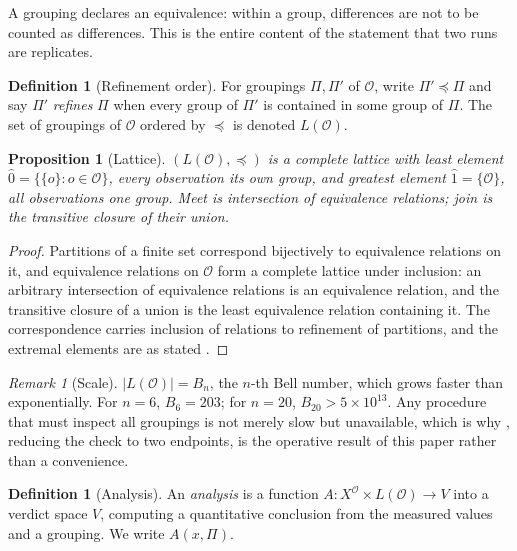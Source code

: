 \documentclass[11pt,a4paper]{article}
\newtheorem{proposition}[theorem]{Proposition}
\theoremstyle{definition}
\newtheorem{definition}[theorem]{Definition}
\theoremstyle{remark}
\newtheorem{remark}[theorem]{Remark}
\newcommand{\Obs}{\mathcal{O}}               %
\newcommand{\Part}{\Pi}                      %
\begin{document}
A grouping declares an equivalence: within a group, differences are not
to be counted as differences. This is the entire content of the statement
that two runs are replicates.

\begin{definition}[Refinement order]\label{def:refine}
For groupings $\Part,\Part'$ of $\Obs$, write $\Part' \preceq \Part$ and
say $\Part'$ \emph{refines} $\Part$ when every group of $\Part'$ is
contained in some group of $\Part$. The set of groupings of $\Obs$
ordered by $\preceq$ is denoted $L(\Obs)$.
\end{definition}

\begin{proposition}[Lattice]\label{prop:lattice}
$(L(\Obs),\preceq)$ is a complete lattice with least element
$\hat{0} = \{\{o\} : o \in \Obs\}$, every observation its own group, and
greatest element $\hat{1} = \{\Obs\}$, all observations one group. Meet
is intersection of equivalence relations; join is the transitive closure
of their union.
\end{proposition}

\begin{proof}
Partitions of a finite set correspond bijectively to equivalence
relations on it, and equivalence relations on $\Obs$ form a complete
lattice under inclusion: an arbitrary intersection of equivalence
relations is an equivalence relation, and the transitive closure of a
union is the least equivalence relation containing it. The correspondence
carries inclusion of relations to refinement of partitions, and the
extremal elements are as stated \citep{birkhoff1967lattice}.
\end{proof}

\begin{remark}[Scale]\label{rem:bell}
$|L(\Obs)| = B_n$, the $n$-th Bell number, which grows faster than
exponentially. For $n = 6$, $B_6 = 203$; for $n = 20$,
$B_{20} > 5 \times 10^{13}$. Any procedure that must inspect all
groupings is not merely slow but unavailable, which is why
, reducing the check to two endpoints, is the
operative result of this paper rather than a convenience.
\end{remark}

\begin{definition}[Analysis]\label{def:analysis}
An \emph{analysis} is a function
$A : X^{\Obs} \times L(\Obs) \to V$
into a verdict space $V$, computing a quantitative conclusion from the
measured values and a grouping. We write $A(x,\Part)$.
\end{definition}
\end{document}
